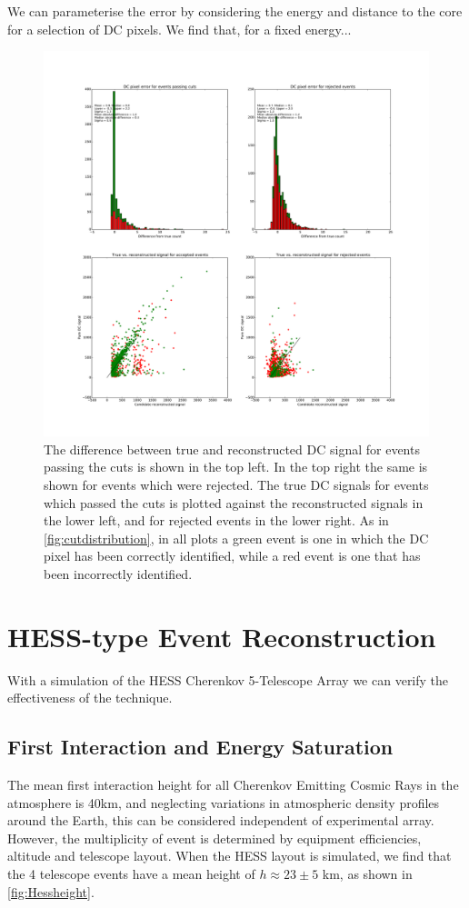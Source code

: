 \documentclass{article}
\begin{document}
We can parameterise the error by considering the energy and distance to the core for a selection of DC pixels. We find that, for a fixed energy...


\begin{figure}
\begin{center}
\includegraphics[width=\textwidth]{DCcounterrorhess1}
\caption{The difference between true and reconstructed DC signal for events passing the cuts is shown in the top left. In the top right the same is shown for events which were rejected. The true DC signals for events which passed the cuts is plotted against the reconstructed signals in the lower left, and for rejected events in the lower right. As in \ref{fig:cutdistribution}, in all plots a green event is one in which the DC pixel has been correctly identified, while a red event is one that has been incorrectly identified.}
\label{fig:dcdiff}
\end{center}
\end{figure}

\section{HESS-type Event Reconstruction}
With a simulation of the HESS Cherenkov 5-Telescope Array we can verify the effectiveness of the technique. 
\subsection{First Interaction and Energy Saturation}
The mean first interaction height for all Cherenkov Emitting Cosmic Rays in the atmosphere is 40km, and neglecting variations in atmospheric density profiles around the Earth, this can be considered independent of experimental array. However, the multiplicity of event is determined by equipment efficiencies, altitude and telescope layout. When the HESS layout is simulated, we find that the 4 telescope events have a mean height of $h \approx 23 \pm 5$ km, as shown in \ref{fig:Hessheight}.
\end{document}
